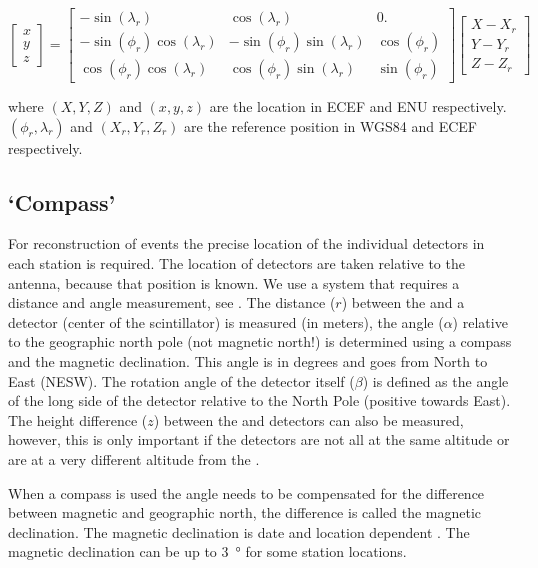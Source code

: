 \begin{equation}
    \begin{bmatrix}
        x \\
        y \\
        z
    \end{bmatrix}
    =
    \begin{bmatrix}
                     -\sin(\lambda_r) &               \cos(\lambda_r) &           0. \\
        -\sin(\phi_r) \cos(\lambda_r) & -\sin(\phi_r) \sin(\lambda_r) & \cos(\phi_r) \\
         \cos(\phi_r) \cos(\lambda_r) &  \cos(\phi_r) \sin(\lambda_r) & \sin(\phi_r)
    \end{bmatrix}
    \begin{bmatrix}
        X - X_r \\
        Y - Y_r \\
        Z - Z_r
    \end{bmatrix}
\end{equation}

\noindent where $(X, Y, Z)$ and $(x, y, z)$ are the location in ECEF and
ENU respectively. $(\phi_r, \lambda_r)$ and $(X_r, Y_r, Z_r)$ are the
reference position in WGS84 and ECEF respectively.


\subsection{`Compass'}

For reconstruction of events the precise location of the individual
detectors in each station is required. The location of detectors are
taken relative to the \gps antenna, because that position is known. We
use a system that requires a distance and angle measurement, see
. The distance ($r$) between the \gps and a
detector (center of the scintillator) is measured (in meters), the angle
($\alpha$) relative to the geographic north pole (not magnetic north!)
is determined using a compass and the magnetic declination. This angle
is in degrees and goes from North to East (NESW). The rotation angle of
the detector itself ($\beta$) is defined as the angle of the long side
of the detector relative to the North Pole (positive towards East). The
height difference ($z$) between the \gps and detectors can also be
measured, however, this is only important if the detectors are not all
at the same altitude or are at a very different altitude from the \gps.

When a compass is used the angle needs to be compensated for the
difference between magnetic and geographic north, the difference is
called the magnetic declination. The magnetic declination is date and
location dependent \cite{canada:2013aa}. The magnetic declination can be
up to \SI{3}{\degree} for some \hisparc station locations.

